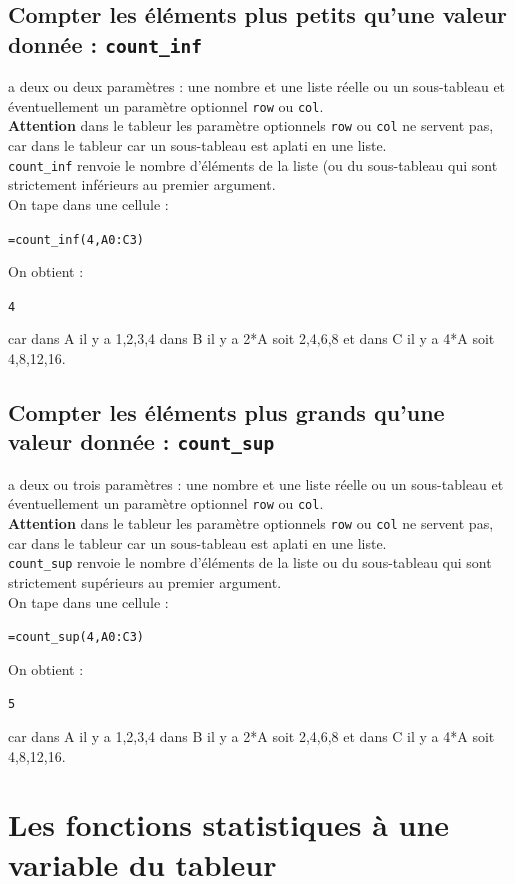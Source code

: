 \documentclass[a4paper,11pt]{book}
\begin{document}
\subsection{Compter les \'el\'ements plus petits qu'une valeur donn\'ee : {\tt count\_inf}}
 a deux ou deux param\`etres : une nombre et une liste
r\'eelle ou un sous-tableau et \'eventuellement un param\`etre 
optionnel {\tt row} ou {\tt col}.\\
{\bf Attention} dans le tableur les param\`etre optionnels {\tt row} ou 
{\tt col} ne servent pas, car dans le tableur car un sous-tableau est aplati en
 une liste.\\
{\tt count\_inf} renvoie le nombre d'\'el\'ements de la liste (ou du 
sous-tableau qui sont strictement inf\'erieurs au premier argument.\\
On tape dans une cellule :
\begin{center}{\tt =count\_inf(4,A0:C3)}\end{center}
On obtient :
\begin{center}{\tt  4}\end{center}
car dans A il y a 1,2,3,4 dans B il y a 2*A soit 2,4,6,8 et dans C il y a 4*A 
soit 4,8,12,16.

\subsection{Compter les \'el\'ements plus grands qu'une valeur donn\'ee : {\tt count\_sup}}
 a deux ou trois param\`etres : une nombre et une 
liste r\'eelle ou un  sous-tableau et \'eventuellement un param\`etre 
optionnel {\tt row} ou {\tt col}.\\
{\bf Attention} dans le tableur les param\`etre optionnels {\tt row} ou 
{\tt col} ne servent pas, car dans le tableur car un sous-tableau est aplati en
 une liste.\\
{\tt count\_sup} renvoie le nombre d'\'el\'ements de la liste 
ou du sous-tableau qui sont  strictement sup\'erieurs au premier argument.\\
On tape dans une cellule :
\begin{center}{\tt =count\_sup(4,A0:C3)}\end{center}
On obtient :
\begin{center}{\tt  5}\end{center}
car dans A il y a 1,2,3,4 dans B il y a 2*A soit 2,4,6,8 et dans C il y a 4*A 
soit 4,8,12,16.
\section{Les fonctions statistiques \`a une variable du tableur}
\end{document}
